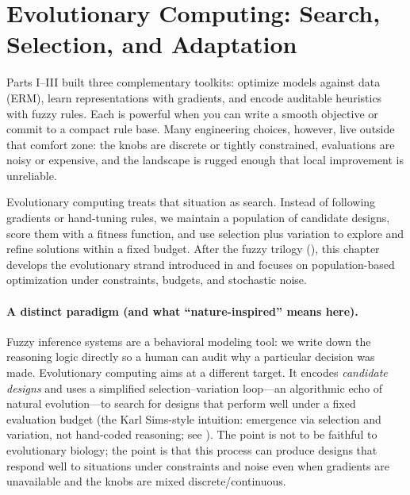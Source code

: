 \section{Evolutionary Computing: Search, Selection, and Adaptation}\label{chap:evo}
\graphicspath{{assets/lec19/}}

Parts I--III built three complementary toolkits: optimize models against data (ERM), learn representations with gradients, and encode auditable heuristics with fuzzy rules. Each is powerful when you can write a smooth objective or commit to a compact rule base. Many engineering choices, however, live outside that comfort zone: the knobs are discrete or tightly constrained, evaluations are noisy or expensive, and the landscape is rugged enough that local improvement is unreliable.

Evolutionary computing treats that situation as search. Instead of following gradients or hand\hyp{}tuning rules, we maintain a population of candidate designs, score them with a fitness function, and use selection plus variation to explore and refine solutions within a fixed budget. After the fuzzy trilogy (), this chapter develops the evolutionary strand introduced in  and focuses on population\hyp{}based optimization under constraints, budgets, and stochastic noise.

\paragraph{A distinct paradigm (and what ``nature-inspired'' means here).}
Fuzzy inference systems are a behavioral modeling tool: we write down the reasoning logic directly so a human can audit why a particular decision was made. Evolutionary computing aims at a different target. It encodes \emph{candidate designs} and uses a simplified selection--variation loop---an algorithmic echo of natural evolution---to search for designs that perform well under a fixed evaluation budget (the Karl Sims\hyp{}style intuition: emergence via selection and variation, not hand-coded reasoning; see \citealp{Sims1994}). The point is not to be faithful to evolutionary biology; the point is that this process can produce designs that respond well to situations under constraints and noise even when gradients are unavailable and the knobs are mixed discrete/continuous.

